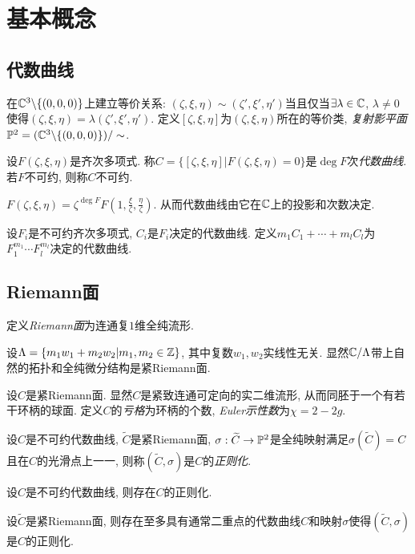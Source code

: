 \chapter{基本概念}\label{c1}
\section{代数曲线}\label{s1-1}
\begin{definition}
    在$\C^3\backslash\{(0,0,0)\}$上建立等价关系: $(\zeta,\xi,\eta)\sim(\zeta',\xi',\eta')$当且仅当$\exists\lambda\in\C$, $\lambda\neq0$使得$(\zeta,\xi,\eta)=\lambda(\zeta',\xi',\eta')$. 定义$[\zeta,\xi,\eta]$为$(\zeta,\xi,\eta)$所在的等价类, \textit{复射影平面}$\P^2=(\C^3\backslash\{(0,0,0)\})/\sim$. 
\end{definition}
\begin{definition}
    设$F(\zeta,\xi,\eta)$是齐次多项式. 称$C=\{[\zeta,\xi,\eta]|F(\zeta,\xi,\eta)=0\}$是$\deg F$次\textit{代数曲线}. 若$F$不可约, 则称$C$不可约. 
\end{definition}
\begin{remark}$F(\zeta,\xi,\eta)=\zeta^{\deg F}F(1,\frac\xi\zeta,\frac\eta\zeta)$. 从而代数曲线由它在$\C$上的投影和次数决定. 
\end{remark}
\begin{definition}
    设$F_i$是不可约齐次多项式, $C_i$是$F_i$决定的代数曲线. 定义$m_1C_1+\cdots+m_l C_l$为$F_1^{m_1}\cdots F_l^{m_l}$决定的代数曲线. 
\end{definition}

\section{Riemann面}\label{s1-2}
\begin{definition}
    定义\textit{Riemann面}为连通复$1$维全纯流形. 
\end{definition}
\begin{example}[复环面]
    设$\Lambda=\{m_1w_1+m_2w_2|m_1,m_2\in\Z\}$, 其中复数$w_1,w_2$实线性无关. 显然$\C/\Lambda$带上自然的拓扑和全纯微分结构是紧Riemann面. 
\end{example}
\begin{definition}
    设$C$是紧Riemann面. 显然$C$是紧致连通可定向的实二维流形, 从而同胚于一个有若干环柄的球面. 定义$C$的\textit{亏格}为环柄的个数, \textit{Euler示性数}为$\chi=2-2g$. 
\end{definition}
\begin{definition}
    设$C$是不可约代数曲线, $\widetilde{C}$是紧Riemann面, $\sigma:\widetilde{C}\to\P^2$是全纯映射满足$\sigma(\widetilde{C})=C$且在$C$的光滑点上一一, 则称$(\widetilde{C},\sigma)$是$C$的\textit{正则化}. 
\end{definition}
\begin{theorem}
    设$C$是不可约代数曲线, 则存在$C$的正则化. 
\end{theorem}
\begin{theorem}
    设$\widetilde{C}$是紧Riemann面, 则存在至多具有通常二重点的代数曲线$C$和映射$\sigma$使得$(\widetilde{C},\sigma)$是$C$的正则化. 
\end{theorem}


